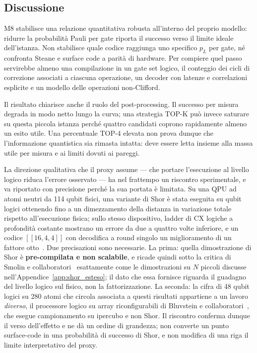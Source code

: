 \begin{onehalfspace}
\subsection{Discussione}
\label{subsec:discussione_logico}

M8 stabilisce una relazione quantitativa robusta all'interno del proprio modello: ridurre la probabilit\`a Pauli per gate riporta il successo verso il limite ideale dell'istanza. Non stabilisce quale codice raggiunga uno specifico $p_L$ per gate, n\'e confronta Steane e surface code a parit\`a di hardware. Per compiere quel passo servirebbe almeno una compilazione in un gate set logico, il conteggio dei cicli di correzione associati a ciascuna operazione, un decoder con latenze e correlazioni esplicite e un modello delle operazioni non-Clifford.

Il risultato chiarisce anche il ruolo del post-processing. Il successo per misura degrada in modo netto lungo la curva; una strategia TOP-K pu\`o invece saturare su questa piccola istanza perch\'e quattro candidati coprono rapidamente almeno un esito utile. Una percentuale TOP-4 elevata non prova dunque che l'informazione quantistica sia rimasta intatta: deve essere letta insieme alla massa utile per misura e ai limiti dovuti ai pareggi.

La direzione qualitativa che il proxy assume --- che portare l'esecuzione al livello logico riduca l'errore osservato --- ha nel frattempo un riscontro sperimentale, e va riportato con precisione perch\'e la sua portata \`e limitata. Su una QPU ad atomi neutri da 114 qubit fisici, una variante di Shor \`e stata eseguita su qubit logici ottenendo fino a un dimezzamento della distanza in variazione totale rispetto all'esecuzione fisica; sullo stesso dispositivo, ladder di CX logiche a profondit\`a costante mostrano un errore da due a quattro volte inferiore, e un codice $[[16,4,4]]$ con decodifica a round singolo un miglioramento di un fattore otto~\cite{rines2025}. Due precisazioni sono necessarie. La prima: quella dimostrazione di Shor \`e \textbf{pre-compilata e non scalabile}, e ricade quindi sotto la critica di Smolin e collaboratori~\cite{smolin2013} esattamente come le dimostrazioni su $N$ piccoli discusse nell'Appendice~\ref{app:shor_esteso}; il dato che essa fornisce riguarda il guadagno del livello logico sul fisico, non la fattorizzazione. La seconda: la cifra di 48 qubit logici su 280 atomi che circola associata a questi risultati appartiene a un lavoro \emph{diverso}, il processore logico su array riconfigurabili di Bluvstein e collaboratori~\cite{bluvstein2024}, che esegue campionamento su ipercubo e non Shor. Il riscontro conferma dunque il verso dell'effetto e ne d\`a un ordine di grandezza; non converte un punto surface-code in una probabilit\`a di successo di Shor, e non modifica di una riga il limite interpretativo del proxy.


\end{onehalfspace}
